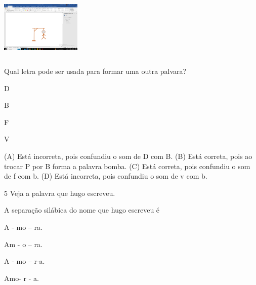 \includegraphics[width=1.50909in,height=1.22355in]{media/image150.png}

Qual letra pode ser usada para formar uma outra palvara?

\begin{minipage}{.5\textwidth}
\begin{escolha}
\item D

\item B

\item F

\item V
\end{escolha}
\end{minipage}

(A) Está incorreta, pois confundiu o som de D com B.
(B) Está correta, pois ao trocar P por B forma a palavra bomba.
(C) Está correta, pois confundiu o som de f com b.
(D) Está incorreta, pois confundiu o som de v com b.

\num{5} Veja a palavra que hugo escreveu.

A separação silábica do nome que hugo escreveu é

\begin{minipage}{.5\textwidth}
\begin{escolha}
\item A - mo -- ra.

\item Am - o -- ra.

\item A - mo -- r-a.

\item Amo- r - a.
\end{escolha}
\end{minipage}

